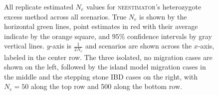 \begin{landscape}
\begin{figure}[ht]
\centering
{}
\caption[ ~~~ - All replicate estimated $N_e$ values for \textsc{neestimator}'s heterozygote excess method across all scenarios.]{All replicate estimated $N_e$ values for \textsc{neestimator}'s heterozygote excess method across all scenarios. True $N_e$ is shown by the horizontal green lines, point estimates in red with their average indicate by the orange square, and $95\%$ confidence intervals by gray vertical lines. $y$-axis is $\frac{1}{2 N_e}$ and scenarios are shown across the $x$-axis, labeled in the center row. The three isolated, no migration cases are shown on the left, followed by the island model migration cases in the middle and the stepping stone IBD cases on the right, with $N_e = 50$ along the top row and 500 along the bottom row.}
\label{fig:supp_neesthet}
\end{figure}



\end{landscape}
